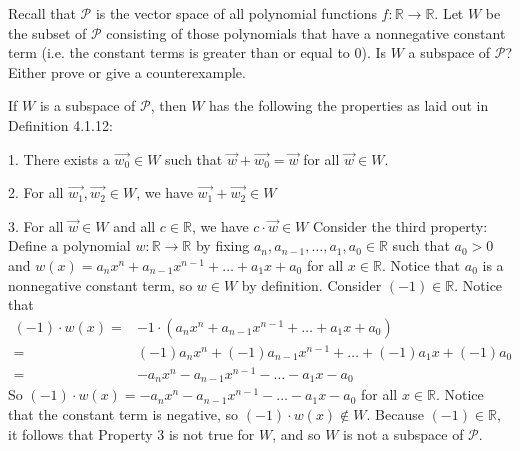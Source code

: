 \documentclass[12pt]{article}
\newenvironment{problem}[2][Problem]
{
	\begin{trivlist} 
		\item[\hskip \labelsep {\bfseries #1 #2:}]
	}
{
	\end{trivlist}
	}
\newenvironment{solution}[1][Solution]
{
	\begin{trivlist} 
		\item[\hskip \labelsep {\itshape #1:}]
	}
	{
	\end{trivlist}
}
\begin{document}
\begin{problem}{1}
Recall that $\mathcal{P}$ is the vector space of all polynomial functions $f: \mathbb{R} \to \mathbb{R}$. Let $W$ be the subset of $\mathcal{P}$ consisting of those polynomials that have a nonnegative constant term (i.e. the constant terms is greater than or equal to 0). Is $W$ a subspace of $\mathcal{P}$? Either prove or give a counterexample.
\noindent
\newline
\newline
\begin{solution}
If $W$ is a subspace of $\mathcal{P}$,  then $W$ has the following the properties as laid out in Definition 4.1.12:

1. There exists a $\vec{w_0} \in W$ such that $\vec{w} + \vec{w_0} = \vec{w}$ for all $\vec{w} \in W$.

2. For all $\vec{w_1},\vec{w_2} \in W$, we have $\vec{w_1}+\vec{w_2} \in W$

3. For all $\vec{w} \in W$ and all $c \in \mathbb{R}$, we have $c\cdot \vec{w} \in W$
\newline
\newline
\noindent
Consider the third property:
\newline
\newline
Define a polynomial $w:\mathbb{R} \to \mathbb{R}$ by fixing $a_n, a_{n-1}, \dots, a_1, a_0 \in \mathbb{R}$ such that $a_0 > 0$ and $w(x) = a_n x^n + a_{n-1} x^{n-1} + \dots + a_1 x + a_0$ for all $x \in \mathbb{R}$. Notice that $a_0$ is a nonnegative constant term, so $w \in W$ by definition. Consider $(-1) \in \mathbb{R}$. Notice that
\begin{align*}
(-1)\cdot w(x) =& -1 \cdot (a_n x^n + a_{n-1} x^{n-1} + \dots + a_1 x + a_0)\\
=& (-1)a_n x^n +  (-1)a_{n-1} x^{n-1} + \dots + (-1)a_1 x + (-1)a_0\\
=& -a_n x^n -a_{n-1} x^{n-1} - \dots - a_1 x - a_0
\end{align*}
So $(-1) \cdot w(x) = -a_n x^n -a_{n-1} x^{n-1} - \dots - a_1 x - a_0$ for all $x \in \mathbb{R}$. Notice that the constant term is negative, so $(-1) \cdot w(x) \notin W$. Because $(-1) \in \mathbb{R}$, it follows that Property 3 is not true for $W$, and so $W$ is not a subspace of $\mathcal{P}$.


\end{solution}
\end{problem}
\end{document}
